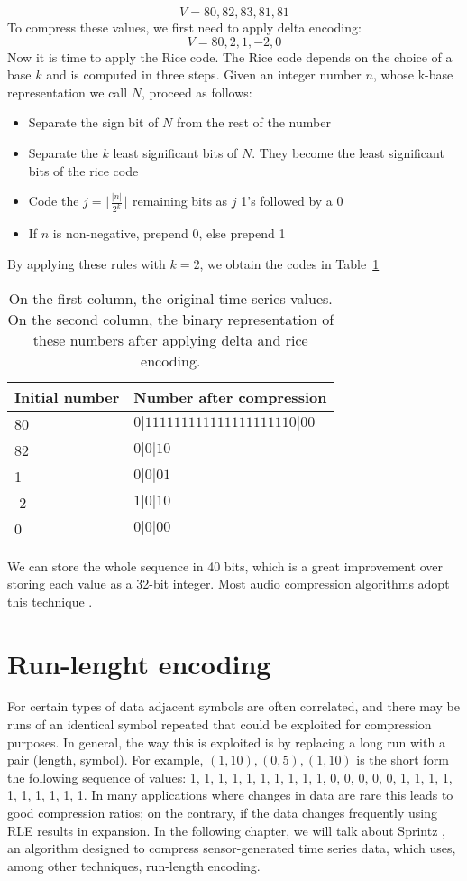 $$V= 80, 82, 83, 81, 81$$
To compress these values, we first need to apply delta encoding:
$$V = 80, 2, 1, -2, 0$$
Now it is time to apply the Rice code. The Rice code depends on the choice of a base
$k$ and is computed in three steps. Given an integer number $n$, whose k-base representation
we call $N$, proceed as follows:
\begin{itemize}
	\item Separate the sign bit of $N$ from the rest of the number
	\item Separate the $k$ least significant bits of $N$. They become the least significant
    bits of the rice code
	\item Code the $j = \lfloor\frac{|n|}{2^k}\rfloor$ remaining bits as $j$ 1’s followed by a 0
	\item If $n$ is non-negative, prepend 0, else prepend 1
\end{itemize}
By applying these rules with $k = 2$, we obtain the codes in Table~\ref{tab:rice}
\begin{table}[]
\centering
\begin{tabular}{l|l}
\textbf{Initial number}     & \textbf{Number after compression} \\ 
\hline
80          & $0|111111111111111111110|00$ \\                    
82          & $0|0|10$                     \\ 
1           & $0|0|01$                     \\              
-2          & $1|0|10$                     \\           
0           & $0|0|00$                     \\            
\end{tabular}
\caption{On the first column, the original time series values.
On the second column, the binary representation of these numbers after applying delta and rice
encoding.}
\label{tab:rice}
\end{table}
We can store the whole sequence in 40 bits, which is a great improvement over storing each
value as a 32-bit integer. Most audio compression algorithms adopt this technique \cite{WikipediaContributors2019Golomb}.

\section{Run-lenght encoding}
For certain types of data adjacent symbols are often correlated, and there may be runs of an
identical symbol repeated that could be exploited for compression purposes. In general, the way
this is exploited is by replacing a long run with a pair (length, symbol). For example,
$(1, 10), (0, 5), (1, 10)$ is the short form the following sequence of values:
1, 1, 1, 1, 1, 1, 1, 1, 1, 1, 0, 0, 0, 0, 0, 1, 1, 1, 1, 1, 1, 1, 1, 1, 1.
In many applications where changes in data are rare this leads to good compression ratios;
on the contrary, if the data changes frequently using RLE results in expansion. In the
following chapter, we will talk about Sprintz \cite{Blalock2018Sprintz},
an algorithm designed to compress sensor-generated time series data, which uses, among other
techniques, run-length encoding.


